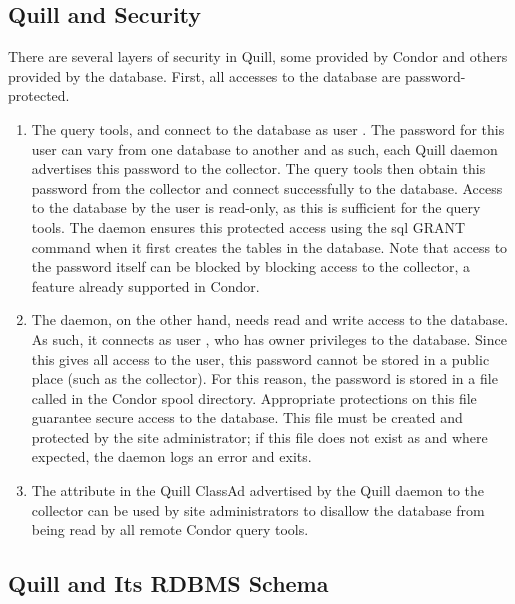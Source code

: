\subsection{\label{sec:Quill-Security}Quill and Security}

There are several layers of security in Quill, some provided by Condor and
others provided by the database.  First, all accesses to the database
are password-protected.

\begin{enumerate}
\item The query tools,  and
 connect to the database as user .
The password for this user can vary from one database to another and
as such, each Quill daemon advertises this password to the collector.
The query tools then obtain this password from the collector and
connect successfully to the database.  Access to the database by the
 user is read-only, as this is sufficient for the
query tools.  The  daemon ensures this protected access using the sql
GRANT command when it first creates the tables in the database.  Note that
access to the  password itself can be blocked by
blocking access to the collector, a feature already supported in Condor.

\item The  daemon, on the other hand, needs read and write access
to the database.  As such, it connects as user ,
who has owner privileges to the database.  Since this gives all
access to the  user, this password cannot
be stored in a public place (such as the collector).  For this
reason, the  password is stored in a file called
 in the Condor spool directory.
Appropriate protections on this file guarantee secure access to the database.
This file must be created and protected by the site administrator;
if this file does not exist as and where expected, the 
daemon logs an error and exits.

\item The  attribute in the Quill ClassAd advertised
by the Quill daemon to the collector can be used by site administrators
to disallow the database from being read by all remote Condor query tools.

\end{enumerate}

\subsection{\label{sec:Quill-Schema}Quill and Its RDBMS Schema}


